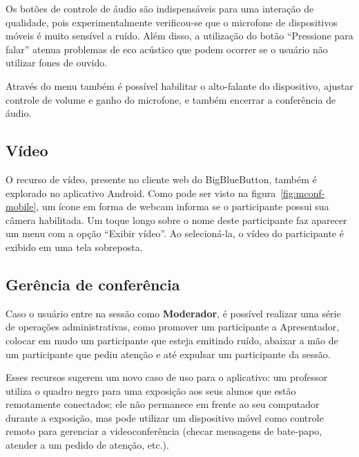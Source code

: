\documentclass{acm_proc_article-sp}
\begin{document}
Os botões de controle de áudio são indispensáveis para uma interação de qualidade, pois experimentalmente verificou-se que o microfone de dispositivos móveis é muito sensível a ruído. Além disso, a utilização do botão ``Pressione para falar'' atenua problemas de eco acústico que podem ocorrer se o usuário não utilizar fones de ouvido.

Através do menu também é possível habilitar o alto-falante do dispositivo, ajustar controle de volume e ganho do microfone, e também encerrar a conferência de áudio.

\subsection{Vídeo}


O recurso de vídeo, presente no cliente web do BigBlueButton, também é explorado no aplicativo Android. Como pode ser visto na figura~\ref{fig:mconf-mobile}, um ícone em forma de webcam informa se o participante possui sua câmera habilitada. Um toque longo sobre o nome deste participante faz aparecer um menu com a opção ``Exibir vídeo''. Ao selecioná-la, o vídeo do participante é exibido em uma tela sobreposta.

\subsection{Gerência de conferência}

Caso o usuário entre na sessão como \textbf{Moderador}, é possível realizar uma série de operações administrativas, como promover um participante a Apresentador, colocar em mudo um participante que esteja emitindo ruído, abaixar a mão de um participante que pediu atenção e até expulsar um participante da sessão. 

Esses recursos sugerem um novo caso de uso para o aplicativo: um professor utiliza o quadro negro para uma exposição aos seus alunos que estão remotamente conectados; ele não permanece em frente ao seu computador durante a exposição, mas pode utilizar um dispositivo móvel como controle remoto para gerenciar a videoconferência (checar mensagens de bate-papo, atender a um pedido de atenção, etc.).
\end{document}
